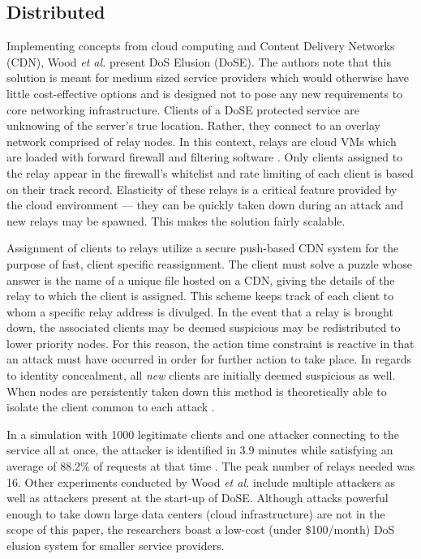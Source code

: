 \documentclass[conference]{IEEEtran}
\begin{document}
\subsection{Distributed}
Implementing concepts from cloud computing and Content Delivery Networks (CDN), Wood \textit{et al.} present DoS Elusion (DoSE). The authors note that this solution is meant for medium sized service providers which would otherwise have little cost-effective options and is designed not to pose any new requirements to core networking infrastructure. Clients of a DoSE protected service are unknowing of the server's true location. Rather, they connect to an overlay network comprised of relay nodes. In this context, relays are cloud VMs which are loaded with forward firewall and filtering software \cite{Wood:DoSE}. Only clients assigned to the relay appear in the firewall's whitelist and rate limiting of each client is based on their track record. Elasticity of these relays is a critical feature provided by the cloud environment --- they can be quickly taken down during an attack and new relays may be spawned. This makes the solution fairly scalable.

Assignment of clients to relays utilize a secure push-based CDN system for the purpose of fast, client specific reassignment. The client must solve a puzzle whose answer is the name of a unique file hosted on a CDN, giving the details of the relay to which the client is assigned. This scheme keeps track of each client to whom a specific relay address is divulged. In the event that a relay is brought down, the associated clients may be deemed suspicious may be redistributed to lower priority nodes. For this reason, the action time constraint is reactive in that an attack must have occurred in order for further action to take place. In regards to identity concealment, all \textit{new} clients are initially deemed suspicious as well. When nodes are persistently taken down this method is theoretically able to isolate the client common to each attack \cite{Wood:DoSE}.

In a simulation with 1000 legitimate clients and one attacker connecting to the service all at once, the attacker is identified in 3.9 minutes while satisfying an average of 88.2\% of requests at that time \cite{Wood:DoSE}. The peak number of relays needed was 16. Other experiments conducted by Wood \textit{et al.} include multiple attackers as well as attackers present at the start-up of DoSE. Although attacks powerful enough to take down large data centers (cloud infrastructure) are not in the scope of this paper, the researchers boast a low-cost (under \$100/month) DoS elusion system for smaller service providers.
\end{document}
